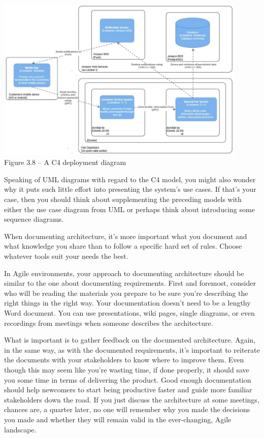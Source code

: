 \begin{center}
\includegraphics[width=0.9\textwidth]{content/1/chapter3/images/8.jpg}\\
Figure 3.8 – A C4 deployment diagram
\end{center}


Speaking of UML diagrams with regard to the C4 model, you might also wonder why it puts such little effort into presenting the system's use cases. If that's your case, then you should think about supplementing the preceding models with either the use case diagram from UML or perhaps think about introducing some sequence diagrams.

When documenting architecture, it's more important what you document and what knowledge you share than to follow a specific hard set of rules. Choose whatever tools suit your needs the best.


In Agile environments, your approach to documenting architecture should be similar to the one about documenting requirements. First and foremost, consider who will be reading the materials you prepare to be sure you're describing the right things in the right way. Your documentation doesn't need to be a lengthy Word document. You can use presentations, wiki pages, single diagrams, or even recordings from meetings when someone describes the architecture.

What is important is to gather feedback on the documented architecture. Again, in the same way, as with the documented requirements, it's important to reiterate the documents with your stakeholders to know where to improve them. Even though this may seem like you're wasting time, if done properly, it should save you some time in terms of delivering the product. Good enough documentation should help newcomers to start being productive faster and guide more familiar stakeholders down the road. If you just discuss the architecture at some meetings, chances are, a quarter later, no one will remember why you made the decisions you made and whether they will remain valid in the ever-changing, Agile landscape.

